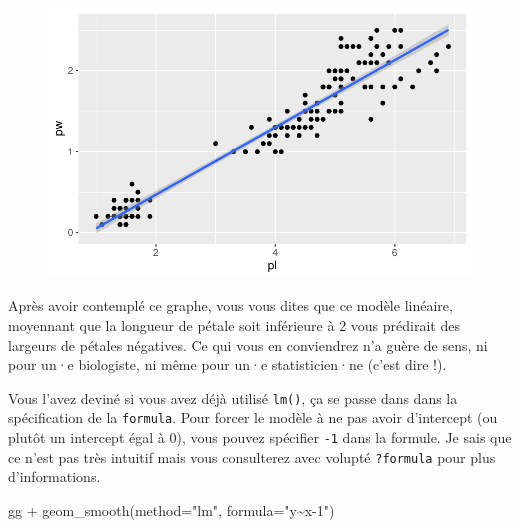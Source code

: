 \documentclass[
  letterpaper,
  DIV=11,
  numbers=noendperiod]{scrreprt}
\newenvironment{Shaded}{\begin{snugshade}}{\end{snugshade}}
\newcommand{\AttributeTok}[1]{\textcolor[rgb]{0.40,0.45,0.13}{#1}}
\newcommand{\FunctionTok}[1]{\textcolor[rgb]{0.28,0.35,0.67}{#1}}
\newcommand{\NormalTok}[1]{\textcolor[rgb]{0.00,0.23,0.31}{#1}}
\newcommand{\SpecialCharTok}[1]{\textcolor[rgb]{0.37,0.37,0.37}{#1}}
\newcommand{\StringTok}[1]{\textcolor[rgb]{0.13,0.47,0.30}{#1}}
\begin{document}
\begin{figure}[H]

{\centering \includegraphics{ggplot2_files/figure-pdf/unnamed-chunk-8-1.pdf}

}

\end{figure}

Après avoir contemplé ce graphe, vous vous dites que ce modèle linéaire,
moyennant que la longueur de pétale soit inférieure à 2 vous prédirait
des largeurs de pétales négatives. Ce qui vous en conviendrez n'a guère
de sens, ni pour un·e biologiste, ni même pour un·e statisticien·ne
(c'est dire !).

Vous l'avez deviné si vous avez déjà utilisé \texttt{lm()}, ça se passe
dans dans la spécification de la \texttt{formula}. Pour forcer le modèle
à ne pas avoir d'intercept (ou plutôt un intercept égal à 0), vous
pouvez spécifier \texttt{-1} dans la formule. Je sais que ce n'est pas
très intuitif mais vous consulterez avec volupté \texttt{?formula} pour
plus d'informations.

\begin{Shaded}
\begin{Highlighting}[]
\NormalTok{gg }\SpecialCharTok{+} \FunctionTok{geom\_smooth}\NormalTok{(}\AttributeTok{method=}\StringTok{"lm"}\NormalTok{, }\AttributeTok{formula=}\StringTok{"y\textasciitilde{}x{-}1"}\NormalTok{)}
\end{Highlighting}
\end{Shaded}
\end{document}
